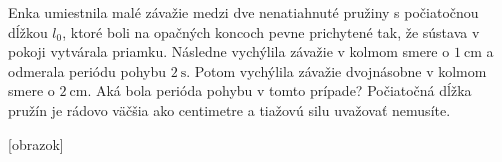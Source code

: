 Enka umiestnila malé závažie medzi dve nenatiahnuté pružiny s
počiatočnou dĺžkou $l_0$, ktoré boli na opačných koncoch pevne
prichytené tak, že sústava v pokoji vytvárala priamku. Následne
vychýlila závažie v kolmom smere o $\SI{1}{\centi\metre}$ a odmerala
periódu pohybu $\SI{2}{\second}$. Potom vychýlila závažie dvojnásobne v
kolmom smere o $\SI{2}{\centi\metre}$. Aká bola perióda pohybu v tomto
prípade? Počiatočná dĺžka pružín je rádovo väčšia ako centimetre a
tiažovú silu uvažovať nemusíte.

{[}obrazok{]}

